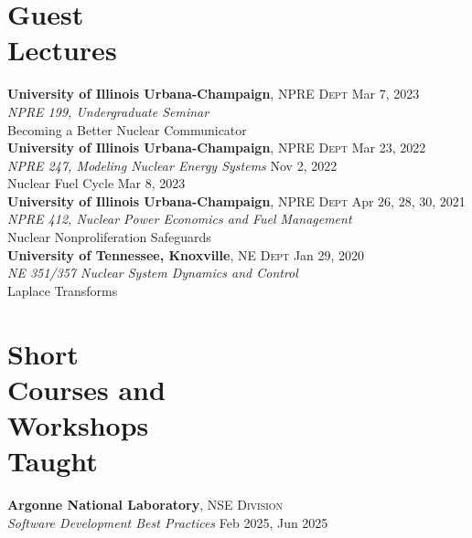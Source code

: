 \documentclass[margin,line]{resume}
\begin{document}
\begin{resume}
    \section{\mysidestyle Guest\\Lectures}
    \textbf{University of Illinois Urbana-Champaign}, \textsc{NPRE Dept} \hfill Mar 7, 2023\\
    \textsl{NPRE 199, Undergraduate Seminar} \\
    Becoming a Better Nuclear Communicator \vspace{1.5mm}\\    
    \textbf{University of Illinois Urbana-Champaign}, \textsc{NPRE Dept} \hfill Mar 23, 2022\\
    \textsl{NPRE 247, Modeling Nuclear Energy Systems} \hfill Nov 2, 2022\\
        Nuclear Fuel Cycle \vspace{1.5mm}\hfill Mar 8, 2023\\
    \textbf{University of Illinois Urbana-Champaign}, \textsc{NPRE Dept} \hfill Apr 26, 28, 30, 2021\\
    \textsl{NPRE 412, Nuclear Power Economics and Fuel Management} \\
        Nuclear Nonproliferation Safeguards \vspace{1.5mm}\\
    \textbf{University of Tennessee, Knoxville}, \textsc{NE Dept} \hfill Jan 29, 2020\\
    \textsl{NE 351/357 Nuclear System Dynamics and Control} \\
        Laplace Transforms
    \section{\mysidestyle Short\\Courses and\\Workshops\\Taught}
    \textbf{Argonne National Laboratory}, \textsc{NSE Division} \\
    \textsl{Software Development Best Practices} \hfill Feb 2025, Jun 2025\\

\end{resume}
\end{document}
